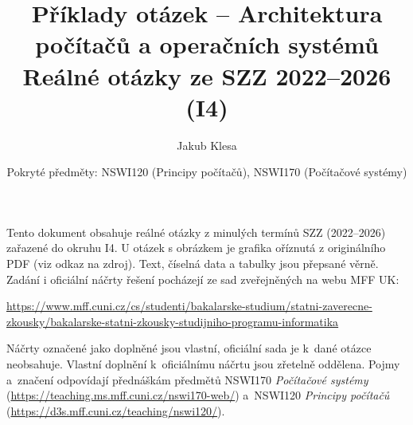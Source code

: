 \documentclass[11pt,a4paper]{article}
\title{Příklady otázek -- Architektura počítačů a operačních systémů\\[0.3em]\large Reálné otázky ze SZZ 2022--2026 (I4)}
\author{Jakub Klesa}
\date{Pokryté předměty: NSWI120 (Principy počítačů), NSWI170 (Počítačové systémy)}
\begin{document}
\sloppy
\maketitle
\tableofcontents
\bigskip

\begin{poznamka}
Tento dokument obsahuje reálné otázky z minulých termínů SZZ (2022--2026) zařazené do
okruhu I4. U otázek s obrázkem je grafika oříznutá z originálního PDF (viz odkaz na
zdroj). Text, číselná data a tabulky jsou přepsané věrně.
Zadání i oficiální náčrty řešení pocházejí ze sad zveřejněných na webu MFF UK:\par
{\raggedright\url{https://www.mff.cuni.cz/cs/studenti/bakalarske-studium/statni-zaverecne-zkousky/bakalarske-statni-zkousky-studijniho-programu-informatika}\par}
Náčrty označené jako doplněné jsou vlastní, oficiální sada je k~dané otázce neobsahuje.
Vlastní doplnění k~oficiálnímu náčrtu jsou zřetelně oddělena.
Pojmy a~značení odpovídají přednáškám předmětů NSWI170 \emph{Počítačové systémy}
(\url{https://teaching.ms.mff.cuni.cz/nswi170-web/}) a~NSWI120 \emph{Principy počítačů}
(\url{https://d3s.mff.cuni.cz/teaching/nswi120/}).
\end{poznamka}
\bigskip











\end{document}
